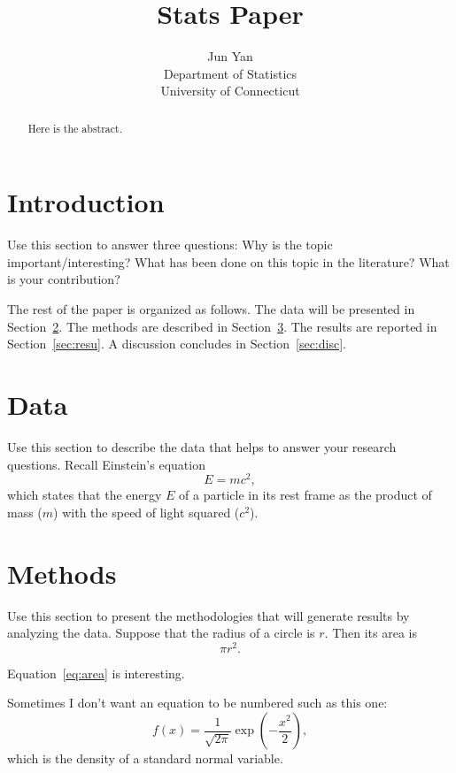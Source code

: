 \documentclass[12pt]{article}
\title{Stats Paper}
\author{Jun Yan\\
  Department of Statistics\\
  University of Connecticut
}
\begin{document}
\maketitle

\begin{abstract}
Here is the abstract.  
\end{abstract}


\section{Introduction}
\label{sec:intro}

Use this section to answer three questions:
Why is the topic important/interesting?
What has been done on this topic in the literature?
What is your contribution?

\lipsum[1-3]

The rest of the paper is organized as follows.
The data will be presented in Section~\ref{sec:data}.
The methods are described in Section~\ref{sec:meth}.
The results are reported in Section~\ref{sec:resu}.
A discussion concludes in Section~\ref{sec:disc}.


\section{Data}
\label{sec:data}

Use this section to describe the data that helps to answer your research
questions. Recall Einstein's equation
\begin{equation}
  \label{eq:mc2}
  E = m c^2,
\end{equation}
which states that the energy $E$ of a particle in its rest frame as the product
of mass ($m$) with the speed of light squared ($c^2$).

\section{Methods}
\label{sec:meth}

Use this section to present the methodologies that will generate results by
analyzing the data. Suppose that the radius of a circle is $r$. Then its area is
\begin{equation}
  \label{eq:area}
  \pi r^2.
\end{equation}

Equation~\eqref{eq:area} is interesting. \lipsum[1-4]

Sometimes I don't want an equation to be numbered such as this one:
\[
  f(x) = \frac{1}{\sqrt{2\pi}} \exp\left( - \frac{x^2}{2} \right),
\]
which is the density of a standard normal variable.
\end{document}
